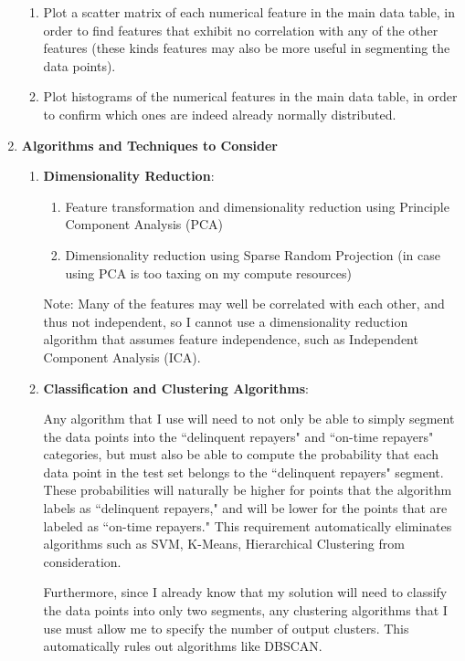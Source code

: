 \documentclass[12pt, letterpaper]{article}
\begin{document}
\begin{enumerate}
\begin{enumerate}
      \item Plot a scatter matrix of each numerical feature in the main data table, in order to find features that exhibit no correlation with any of the other features (these kinds features may also be more useful in segmenting the data points).
      \item Plot histograms of the numerical features in the main data table, in order to confirm which ones are indeed already normally distributed.
    \end{enumerate}
  \item \textbf{Algorithms and Techniques to Consider}
    \begin{enumerate}
      \item \textbf{Dimensionality Reduction}:
        \begin{enumerate}
          \item Feature transformation and dimensionality reduction using Principle Component Analysis (PCA)
          \item Dimensionality reduction using Sparse Random Projection (in case using PCA is too taxing on my compute resources)
        \end{enumerate}
        Note: Many of the features may well be correlated with each other, and thus not independent, so I cannot use a dimensionality reduction algorithm that assumes feature independence, such as Independent Component Analysis (ICA).
      \item \textbf{Classification and Clustering Algorithms}:

      Any algorithm that I use will need to not only be able to simply segment the data points into the ``delinquent repayers" and ``on-time repayers" categories, but must also be able to compute the probability that each data point in the test set belongs to the ``delinquent repayers" segment. These probabilities will naturally be higher for points that the algorithm labels as ``delinquent repayers," and will be lower for the points that are labeled as ``on-time repayers." This requirement automatically eliminates algorithms such as SVM, K-Means, Hierarchical Clustering from consideration.

      Furthermore, since I already know that my solution will need to classify the data points into only two segments, any clustering algorithms that I use must allow me to specify the number of output clusters. This automatically rules out algorithms like DBSCAN.


\end{enumerate}
\end{enumerate}
\end{document}
